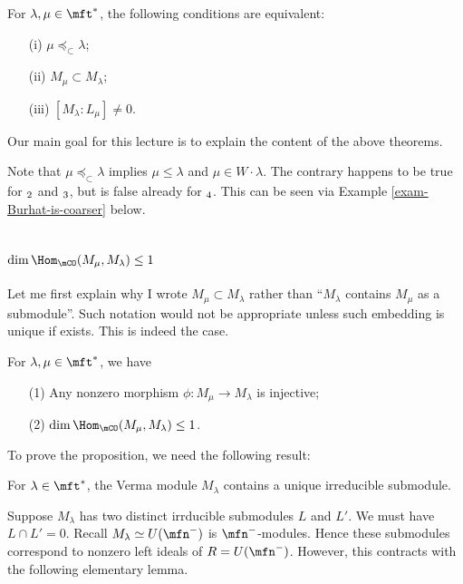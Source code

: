 \begin{cor}
	For $\lambda,\mu \in \mft^*$, the following conditions are equivalent:
	\begin{itemize}
		\item[(i)]
			$\mu \preceq_\subset \lambda$;
		\item[(ii)]
			$M_\mu \subset M_\lambda$;
		\item[(iii)]
			$[M_\lambda:L_\mu] \neq 0$.
	\end{itemize}
\end{cor}

	Our main goal for this lecture is to explain the content of the above theorems.

\begin{warn}
	Note that $\mu \preceq_\subset \lambda$ implies $\mu \le \lambda$ and $\mu \in W\cdot \lambda$. The contrary happens to be true for $\sl_2$ and $\sl_3$, but is false already for $\sl_4$. This can be seen via Example \ref{exam-Burhat-is-coarser} below.
\end{warn}

\section{\texorpdfstring{$\dim \Hom_\mCO( M_\mu,M_\lambda ) \le 1$}{At most one morphism between Verma modules}}
	Let me first explain why I wrote $M_\mu \subset M_\lambda$ rather than ``$M_\lambda$ contains $M_\mu$ as a submodule''. Such notation would not be appropriate unless such embedding is unique if exists. This is indeed the case.

\begin{prop}
	\label{prop-Hom-Verma}
	For $\lambda,\mu \in \mft^*$, we have
	\begin{itemize}
		\item[(1)]
			Any nonzero morphism $\phi: M_\mu \to M_\lambda$ is injective;
		\item[(2)]
			$\dim \Hom_\mCO( M_\mu,M_\lambda ) \le 1$.
	\end{itemize}
\end{prop}

To prove the proposition, we need the following result:

\begin{prop}
	\label{prop-simplesub-Verma}
	For $\lambda \in \mft^*$, the Verma module $M_\lambda$ contains a unique irreducible submodule.
\end{prop}

\proof
	Suppose $M_\lambda$ has two distinct irrducible submodules $L$ and $L'$. We must have $L\cap L' = 0$. Recall $M_\lambda \simeq U(\mfn^-)$ is $\mfn^-$-modules. Hence these submodules correspond to nonzero left ideals of $R=U(\mfn^-)$. However, this contracts with the following elementary lemma.

